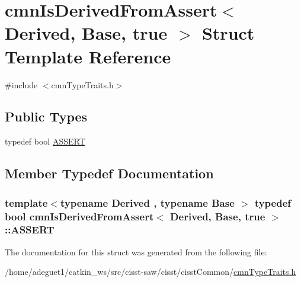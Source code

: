 \hypertarget{structcmn_is_derived_from_assert_3_01_derived_00_01_base_00_01true_01_4}{\section{cmn\-Is\-Derived\-From\-Assert$<$ Derived, Base, true $>$ Struct Template Reference}
\label{structcmn_is_derived_from_assert_3_01_derived_00_01_base_00_01true_01_4}
}


{\ttfamily \#include $<$cmn\-Type\-Traits.\-h$>$}

\subsection*{Public Types}
\begin{DoxyCompactItemize}
\item 
typedef bool \hyperlink{structcmn_is_derived_from_assert_3_01_derived_00_01_base_00_01true_01_4_a545af271f5b245790db2277f5ca2fc01}{A\-S\-S\-E\-R\-T}
\end{DoxyCompactItemize}


\subsection{Member Typedef Documentation}
\hypertarget{structcmn_is_derived_from_assert_3_01_derived_00_01_base_00_01true_01_4_a545af271f5b245790db2277f5ca2fc01}{
\subsubsection[{A\-S\-S\-E\-R\-T}]{\setlength{\rightskip}{0pt plus 5cm}template$<$typename Derived , typename Base $>$ typedef bool {\bf cmn\-Is\-Derived\-From\-Assert}$<$ Derived, Base, true $>$\-::{\bf A\-S\-S\-E\-R\-T}}}\label{structcmn_is_derived_from_assert_3_01_derived_00_01_base_00_01true_01_4_a545af271f5b245790db2277f5ca2fc01}


The documentation for this struct was generated from the following file\-:\begin{DoxyCompactItemize}
\item 
/home/adeguet1/catkin\-\_\-ws/src/cisst-\/saw/cisst/cisst\-Common/\hyperlink{cmn_type_traits_8h}{cmn\-Type\-Traits.\-h}\end{DoxyCompactItemize}
